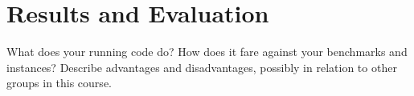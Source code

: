 \chapter{Results and Evaluation}

What does your running code do? How does it fare against your benchmarks and instances? Describe advantages and disadvantages, possibly in relation to other groups in this course.

